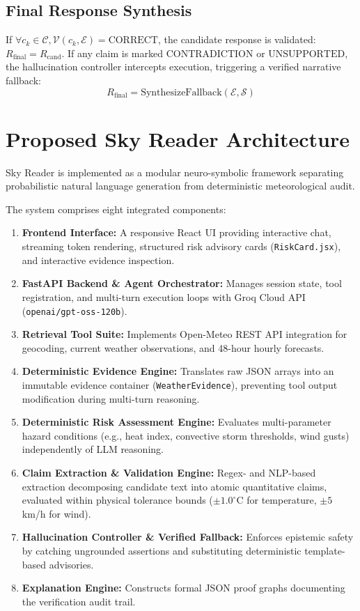 \documentclass[conference]{IEEEtran}
\begin{document}
\subsection{Final Response Synthesis}
If $\forall c_k \in \mathcal{C}, \mathcal{V}(c_k, \mathcal{E}) = \text{CORRECT}$, the candidate response is validated: $R_{\text{final}} = R_{\text{cand}}$. If any claim is marked $\text{CONTRADICTION}$ or $\text{UNSUPPORTED}$, the hallucination controller intercepts execution, triggering a verified narrative fallback:
\begin{equation}
R_{\text{final}} = \text{SynthesizeFallback}(\mathcal{E}, \mathcal{S})
\end{equation}

\section{Proposed Sky Reader Architecture}

Sky Reader is implemented as a modular neuro-symbolic framework separating probabilistic natural language generation from deterministic meteorological audit.

The system comprises eight integrated components:
\begin{enumerate}
    \item \textbf{Frontend Interface:} A responsive React UI providing interactive chat, streaming token rendering, structured risk advisory cards (\texttt{RiskCard.jsx}), and interactive evidence inspection.
    \item \textbf{FastAPI Backend \& Agent Orchestrator:} Manages session state, tool registration, and multi-turn execution loops with Groq Cloud API (\texttt{openai/gpt-oss-120b}).
    \item \textbf{Retrieval Tool Suite:} Implements Open-Meteo REST API integration for geocoding, current weather observations, and 48-hour hourly forecasts.
    \item \textbf{Deterministic Evidence Engine:} Translates raw JSON arrays into an immutable evidence container (\texttt{WeatherEvidence}), preventing tool output modification during multi-turn reasoning.
    \item \textbf{Deterministic Risk Assessment Engine:} Evaluates multi-parameter hazard conditions (e.g., heat index, convective storm thresholds, wind gusts) independently of LLM reasoning.
    \item \textbf{Claim Extraction \& Validation Engine:} Regex- and NLP-based extraction decomposing candidate text into atomic quantitative claims, evaluated within physical tolerance bounds ($\pm 1.0^\circ$C for temperature, $\pm 5$\,km/h for wind).
    \item \textbf{Hallucination Controller \& Verified Fallback:} Enforces epistemic safety by catching ungrounded assertions and substituting deterministic template-based advisories.
    \item \textbf{Explanation Engine:} Constructs formal JSON proof graphs documenting the verification audit trail.
\end{enumerate}
\end{document}
